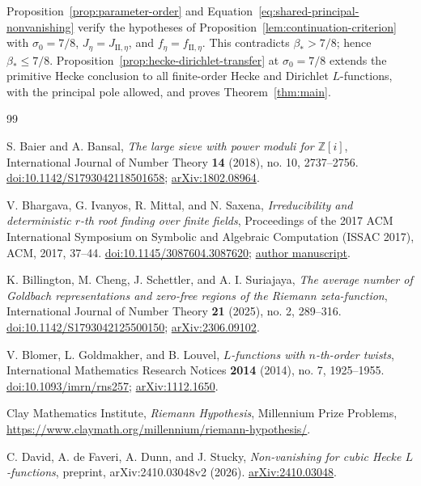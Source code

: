 Proposition~\ref{prop:parameter-order} and
Equation~\eqref{eq:shared-principal-nonvanishing} verify the hypotheses of
Proposition~\ref{lem:continuation-criterion} with
\(\sigma_0=7/8\), \(J_\eta=J_{\mathrm{II},\eta}\), and
\(f_\eta=f_{\mathrm{II},\eta}\).  This contradicts \(\beta_*>7/8\);
hence \(\beta_*\le7/8\).  Proposition~\ref{prop:hecke-dirichlet-transfer}
at \(\sigma_0=7/8\) extends the primitive Hecke conclusion to all
finite-order Hecke and Dirichlet \(L\)-functions, with the principal pole
allowed, and proves Theorem~\ref{thm:main}.
\begin{thebibliography}{99}

S. Baier and A. Bansal,
\emph{The large sieve with power moduli for $\mathbb Z[i]$},
International Journal of Number Theory \textbf{14} (2018), no. 10,
2737--2756.
\href{https://doi.org/10.1142/S1793042118501658}{doi:10.1142/S1793042118501658};
\href{https://arxiv.org/abs/1802.08964}{arXiv:1802.08964}.

V. Bhargava, G. Ivanyos, R. Mittal, and N. Saxena,
\emph{Irreducibility and deterministic $r$-th root finding over finite fields},
Proceedings of the 2017 ACM International Symposium on Symbolic and
Algebraic Computation (ISSAC 2017), ACM, 2017, 37--44.
\href{https://doi.org/10.1145/3087604.3087620}{doi:10.1145/3087604.3087620};
\href{https://www.cse.iitk.ac.in/users/nitin/papers/irred-and-rth-root.pdf}{author manuscript}.

K. Billington, M. Cheng, J. Schettler, and A. I. Suriajaya,
\emph{The average number of Goldbach representations and zero-free regions
of the Riemann zeta-function},
International Journal of Number Theory \textbf{21} (2025), no. 2, 289--316.
\href{https://doi.org/10.1142/S1793042125500150}{doi:10.1142/S1793042125500150};
\href{https://arxiv.org/abs/2306.09102}{arXiv:2306.09102}.

V. Blomer, L. Goldmakher, and B. Louvel,
\emph{$L$-functions with $n$-th-order twists},
International Mathematics Research Notices \textbf{2014} (2014), no. 7,
1925--1955.
\href{https://doi.org/10.1093/imrn/rns257}{doi:10.1093/imrn/rns257};
\href{https://arxiv.org/abs/1112.1650}{arXiv:1112.1650}.

Clay Mathematics Institute,
\emph{Riemann Hypothesis}, Millennium Prize Problems,
\url{https://www.claymath.org/millennium/riemann-hypothesis/}.

C. David, A. de Faveri, A. Dunn, and J. Stucky,
\emph{Non-vanishing for cubic Hecke $L$-functions},
preprint, arXiv:2410.03048v2 (2026).
\href{https://arxiv.org/abs/2410.03048}{arXiv:2410.03048}.


\end{thebibliography}
